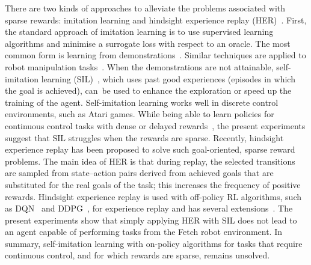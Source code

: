 There are two kinds of approaches to alleviate the problems associated with sparse rewards: imitation learning and hindsight experience replay (HER)~\cite{andrychowicz2017hindsight}. First, the standard approach of imitation learning is to use supervised learning algorithms and minimise a surrogate loss with respect to an oracle. The most common form is learning from demonstrations~\cite{hester2018deep,gao2018reinforcement}. Similar techniques are applied to robot manipulation tasks~\cite{rajeswaran2017learning,vevcerik2017leveraging,nair2018overcoming,james2018task}. When the demonstrations are not attainable, self-imitation learning (SIL)~\cite{oh2018self}, which uses past good experiences (episodes in which the goal is achieved), can~be used to enhance the exploration or speed up the training of the agent. {Self-imitation learning} works well in discrete control environments, such as Atari games. While being able to learn policies for continuous control tasks with dense or delayed rewards~\cite{oh2018self}, the present experiments suggest that SIL struggles when the rewards are sparse. Recently, {hindsight experience replay} has been proposed to solve such goal-oriented, sparse reward problems. The main idea of HER is that during replay, the selected transitions are sampled from state--action pairs derived from {achieved goals} that are substituted for the real goals of the task; this increases the frequency of positive rewards. {Hindsight experience replay} is used with off-policy RL algorithms, such as DQN~\cite{mnih2015human} and DDPG~\cite{lillicrap2015continuous}, for experience replay and has several extensions~\cite{schaul2015prioritized,liu2018competitive}. The present experiments show that simply applying HER with SIL does not lead to an agent capable of performing tasks from the Fetch robot environment. In summary, self-imitation learning with on-policy algorithms for tasks that require continuous control, and for which rewards are sparse, remains unsolved.

